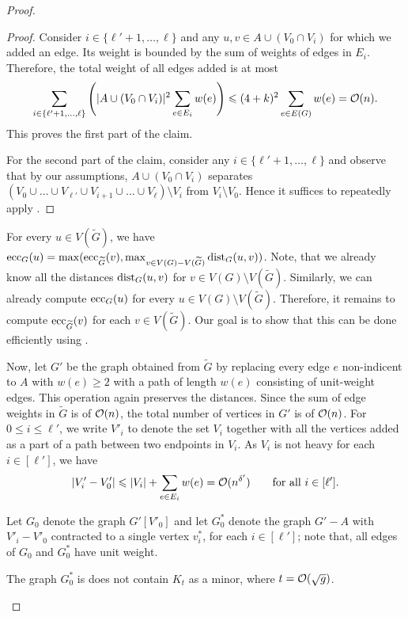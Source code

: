 \begin{proof}
\begin{proof}
Consider $i \in \{\ell' + 1, \dots, \ell\}$ and any $u, v \in A \cup (V_0 \cap V_i)$ for which we added an edge. Its weight is bounded by the sum of weights of edges in $E_i$. Therefore, the total weight of all edges added is at most
$$
\sum_{i \in \{\ell' + 1, \dots, \ell\}} \left( |A \cup (V_0 \cap V_i)|^2 \sum_{e \in E_i} w(e) \right) \leqslant (4 + k)^2 \sum_{e \in E(G)} w(e) = \mathcal{O}(n).
$$
This proves the first part of the claim.

For the second part of the claim, consider any $i \in \{\ell' + 1, \dots, \ell \}$ and observe that by our assumptions, $A \cup (V_0 \cap V_i)$ separates $(V_0 \cup \dots \cup V_{\ell'} \cup V_{i + 1} \cup \dots \cup V_\ell) \setminus V_i$ from $V_i \setminus V_0$. Hence it suffices to repeatedly apply .
\end{proof}

For every $u \in V(\widetilde{G})$, we have $\mathrm{ecc}_G(u) = \max(\mathrm{ecc}_{\widetilde{G}}(v), \max_{v \in V(G) - V(\widetilde{G})} \mathrm{dist}_G(u, v))$. Note, that we already know all the distances $\mathrm{dist}_G(u, v)$ for $v \in V(G) \setminus V(\widetilde{G})$. Similarly, we can already compute $\mathrm{ecc}_G(u)$ for every $u \in V(G) \setminus V(\widetilde{G})$. Therefore, it remains to compute $\mathrm{ecc}_{\widetilde{G}}(v)$ for each $v \in V(\widetilde{G})$. Our goal is to show that this can be done efficiently using .

Now, let $G'$ be the graph obtained from $\tilde{G}$ by replacing every edge $e$ non-indicent to $A$ with $w(e)\geq 2$ with a path of length $w(e)$ consisting of unit-weight edges. This operation again preserves the distances. Since the sum of edge weights in $\tilde{G}$ is of $\mathcal{O}(n)$, the total number of vertices in $G'$ is of $\mathcal{O}(n)$. For $0 \leq i \leq \ell'$, we write $V'_i$ to denote the set $V_i$ together with all the vertices added as a part of a path between two endpoints in $V_i$.
As $V_i$ is not heavy for each $i\in [\ell']$, we have
$$
|V'_i - V'_0| \leqslant |V_i| + \sum_{e \in E_i} w(e) = \mathcal{O}(n^{\delta'})\qquad \textrm{for all }i\in [\ell'].
$$

Let $G_0$ denote the graph $G'[V'_0]$ and let $G_0^*$ denote the graph $G'- A$ with $V'_i - V'_0$ contracted to a single vertex $v_i^*$, for each $i \in [\ell']$; note that, all edges of $G_0$ and $G_0^*$ have unit weight.

\begin{claim}
	The graph $G_0^*$ is does not contain $K_{t}$ as a minor, where $t = \mathcal{O}(\sqrt{g})$.
\end{claim}


\end{proof}

